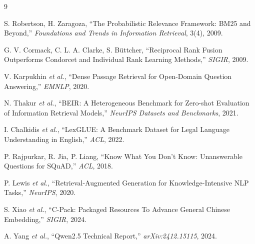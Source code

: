 \documentclass[11pt,a4paper]{article}
\begin{document}
\begin{thebibliography}{9}\small

 S. Robertson, H. Zaragoza, ``The Probabilistic Relevance Framework: BM25 and Beyond,'' \emph{Foundations and Trends in Information Retrieval}, 3(4), 2009.

 G. V. Cormack, C. L. A. Clarke, S. B\"uttcher, ``Reciprocal Rank Fusion Outperforms Condorcet and Individual Rank Learning Methods,'' \emph{SIGIR}, 2009.

 V. Karpukhin \emph{et al.}, ``Dense Passage Retrieval for Open-Domain Question Answering,'' \emph{EMNLP}, 2020.

 N. Thakur \emph{et al.}, ``BEIR: A Heterogeneous Benchmark for Zero-shot Evaluation of Information Retrieval Models,'' \emph{NeurIPS Datasets and Benchmarks}, 2021.

 I. Chalkidis \emph{et al.}, ``LexGLUE: A Benchmark Dataset for Legal Language Understanding in English,'' \emph{ACL}, 2022.

 P. Rajpurkar, R. Jia, P. Liang, ``Know What You Don't Know: Unanswerable Questions for SQuAD,'' \emph{ACL}, 2018.

 P. Lewis \emph{et al.}, ``Retrieval-Augmented Generation for Knowledge-Intensive NLP Tasks,'' \emph{NeurIPS}, 2020.

 S. Xiao \emph{et al.}, ``C-Pack: Packaged Resources To Advance General Chinese Embedding,'' \emph{SIGIR}, 2024.

 A. Yang \emph{et al.}, ``Qwen2.5 Technical Report,'' \emph{arXiv:2412.15115}, 2024.

\end{thebibliography}
\end{document}

